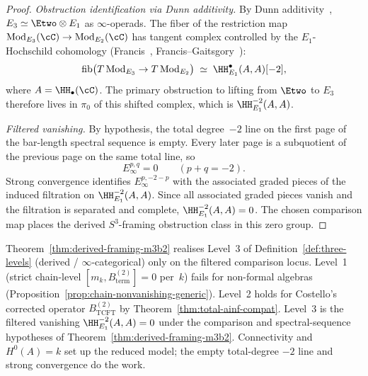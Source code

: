 \begin{proof}
\emph{Obstruction identification via Dunn additivity.}
By Dunn additivity~\cite{Dunn1988},
$E_3 \simeq \Etwo \otimes E_1$ as $\infty$-operads. The fiber
of the restriction map
$\mathrm{Mod}_{E_3}(\cC) \to \mathrm{Mod}_{E_2}(\cC)$ has
tangent complex controlled by the $E_1$-Hochschild cohomology
(Francis~\cite{Francis2013},
Francis--Gaitsgory~\cite{FrancisGaitsgory2012}):
\[
 \mathrm{fib}\bigl(T\,\mathrm{Mod}_{E_3} \to T\,\mathrm{Mod}_{E_2}\bigr)
 \;\simeq\; \HH^\bullet_{E_1}(A, A)[-2],
\]
where $A = \HH_\bullet(\cC)$. The primary obstruction to
lifting from $\Etwo$ to $E_3$ therefore lives in $\pi_0$ of
this shifted complex, which is $\HH^{-2}_{E_1}(A, A)$.

\smallskip\noindent\emph{Filtered vanishing.}
By hypothesis, the total degree~$-2$ line on the first page of
the bar-length spectral sequence is empty.  Every later page is
a subquotient of the previous page on the same total line, so
\[
        E_\infty^{p,q}=0\qquad(p+q=-2).
\]
Strong convergence identifies
$E_\infty^{p,-2-p}$ with the associated graded pieces of the
induced filtration on $\HH^{-2}_{E_1}(A,A)$. Since all associated
graded pieces vanish and the filtration is separated and
complete, $\HH^{-2}_{E_1}(A,A)=0$.  The chosen comparison map
places the derived $S^3$-framing obstruction class in this zero
group.
\end{proof}

\begin{remark}
\label{rem:derived-framing-m3b2-three-levels}
Theorem~\ref{thm:derived-framing-m3b2} realises Level~3 of
Definition~\ref{def:three-levels} (derived / $\infty$-categorical)
only on the filtered comparison locus.  Level~1 (strict
chain-level $[m_k, B^{(2)}_{\mathrm{term}}] = 0$ per~$k$)
fails for non-formal algebras
(Proposition~\ref{prop:chain-nonvanishing-generic}).  Level~2
holds for Costello's corrected operator
$B^{(2)}_{\mathrm{TCFT}}$ by Theorem~\ref{thm:total-ainf-compat}.
Level~3 is the filtered vanishing
$\HH^{-2}_{E_1}(A,A)=0$ under the comparison and spectral-sequence
hypotheses of Theorem~\ref{thm:derived-framing-m3b2}.  Connectivity
and $H^0(A)=k$ set up the reduced model; the empty total-degree
$-2$ line and strong convergence do the work.
\end{remark}

